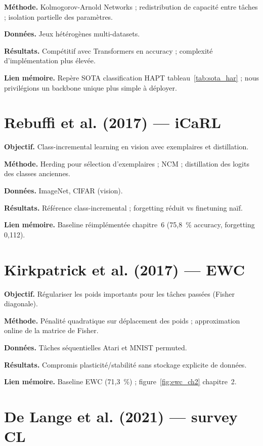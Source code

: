 \documentclass[a4paper,12pt]{report}
\begin{document}
\textbf{Méthode.} Kolmogorov-Arnold Networks ; redistribution de capacité entre
tâches ; isolation partielle des paramètres.

\textbf{Données.} Jeux hétérogènes multi-datasets.

\textbf{Résultats.} Compétitif avec Transformers en accuracy ; complexité
d'implémentation plus élevée.

\textbf{Lien mémoire.} Repère SOTA classification HAPT tableau~\ref{tab:sota_har} ;
nous privilégions un backbone unique plus simple à déployer.

\section{Rebuffi et al. (2017) — iCaRL}

\textbf{Objectif.} Class-incremental learning en vision avec exemplaires et
distillation.

\textbf{Méthode.} Herding pour sélection d'exemplaires ; NCM ; distillation des
logits des classes anciennes.

\textbf{Données.} ImageNet, CIFAR (vision).

\textbf{Résultats.} Référence class-incremental ; forgetting réduit vs finetuning
naïf.

\textbf{Lien mémoire.} Baseline réimplémentée chapitre~6 (75,8~\% accuracy,
forgetting 0,112).

\section{Kirkpatrick et al. (2017) — EWC}

\textbf{Objectif.} Régulariser les poids importants pour les tâches passées
(Fisher diagonale).

\textbf{Méthode.} Pénalité quadratique sur déplacement des poids ; approximation
online de la matrice de Fisher.

\textbf{Données.} Tâches séquentielles Atari et MNIST permuted.

\textbf{Résultats.} Compromis plasticité/stabilité sans stockage explicite de
données.

\textbf{Lien mémoire.} Baseline EWC (71,3~\%) ; figure~\ref{fig:ewc_ch2} chapitre~2.

\section{De Lange et al. (2021) — survey CL}
\end{document}
